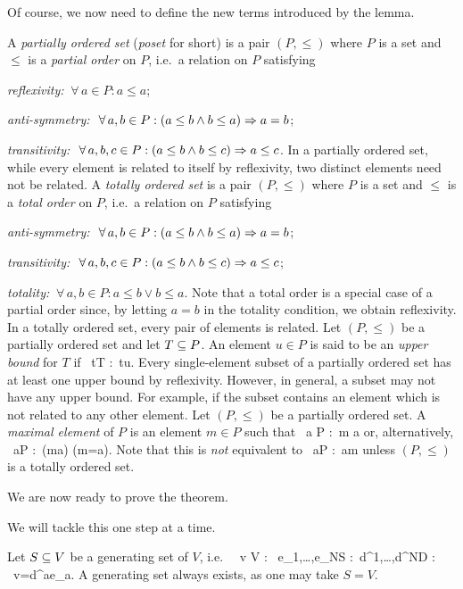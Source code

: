 Of course, we now need to define the new terms introduced by the lemma. 

\bd
A \emph{partially ordered set} (\emph{poset} for short) is a pair $(P,\leq)$ where $P$ is a set and~$\leq$ is a \emph{partial order} on $P$, i.e.\ a relation on $P$ satisfying
\ben[label=\roman*)]
\item \emph{reflexivity:} $\ \forall \, a \in P: a\leq a$;
\item \emph{anti-symmetry:} $\ \forall \, a,b\in P : ( a\leq b \land b\leq a) \Rightarrow a=b$;
\item \emph{transitivity:} $\ \forall \, a,b,c\in P:(a\leq b \land b\leq c)\Rightarrow a\leq c$.
\een
\ed
In a partially ordered set, while every element is related to itself by reflexivity, two distinct elements need not be related.
\bd
A \emph{totally ordered set} is a pair $(P,\leq)$ where $P$ is a set and $\leq$ is a \emph{total order} on $P$, i.e.\ a relation on $P$ satisfying
\ben[label=\alph*)]
\item \emph{anti-symmetry:} $\ \forall \, a,b\in P : ( a\leq b \land b\leq a) \Rightarrow a=b$;
\item \emph{transitivity:} $\ \forall \, a,b,c\in P:(a\leq b \land b\leq c)\Rightarrow a\leq c$;
\item \emph{totality:} $\ \forall \, a,b \in P: a\leq b\lor b\leq a$.
\een
\ed
Note that a total order is a special case of a partial order since, by letting $a=b$ in the totality condition, we obtain reflexivity. In a totally ordered set, every pair of elements is related. 
\bd
Let $(P,\leq)$ be a partially ordered set and let $T\subseteq P$. An element $u\in P$ is said to be an \emph{upper bound} for $T$ if
\bse
\forall \, t\in T :\ t\leq u.
\ese
\ed
Every single-element subset of a partially ordered set has at least one upper bound by reflexivity. However, in general, a subset may not have any upper bound. For example, if the subset contains an element which is not related to any other element.
\bd
Let $(P,\leq)$ be a partially ordered set. A \emph{maximal element} of $P$ is an element $m\in P$ such that
\bse
\nexists \, a \in P :\ m \leq a
\ese
or, alternatively,
\bse
\forall \, a\in P :\ (m\leq a) \imp (m=a).
\ese
Note that this is \emph{not} equivalent to 
\bse
\forall \, a\in P :\ a\leq m
\ese
unless $(P,\leq)$ is a totally ordered set.
\ed

We are now ready to prove the theorem.

 We will tackle this one step at a time.
\ben[label=\alph*)]

\item Let $S\subseteq V$ be a generating set of $V$, i.e.\
\bse
\forall \, v \in V : \exists \, e_1,\ldots,e_N\in S : \exists \,d^1,\ldots,d^N\in D : \ v=d^ae_a. 
\ese
A generating set always exists, as one may take $S=V$.

